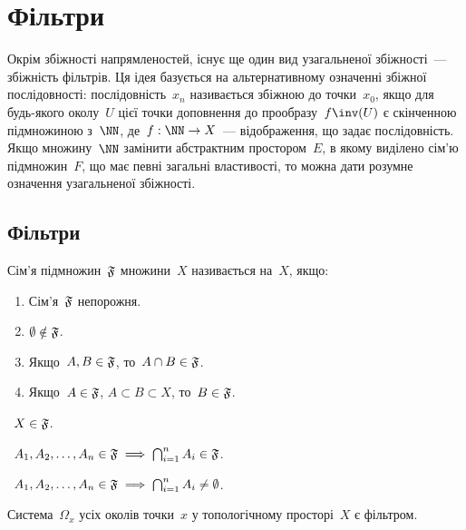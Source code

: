 \chapter{Фільтри}

Окрім збіжності напрямленостей, існує ще один вид узагальненої збіжності~--- збіжність фільтрів. Ця ідея базується на альтернативному означенні збіжної послідовності: послідовність~$x_n$ називається збіжною до точки~$x_0$, якщо для будь-якого околу~$U$ цієї точки доповнення до прообразу~$f\inv (U)$ є скінченною підмножиною з~$\NN$, де~$f: \NN \to X$~--- відображення, що задає послідовність. Якщо множину~$\NN$ замінити абстрактним простором~$E$, в якому виділено сім'ю підмножин~$F$, що має певні загальні властивості, то можна дати розумне означення узагальненої збіжності.

\section{Фільтри}

\begin{definition}
    Сім'я підмножин~$\frak F$ множини~$X$ називається  на~$X$, якщо:
    \begin{enumerate}
        \item Сім'я~$\frak F$ непорожня.
        \item $\emptyset \notin \frak F$.
        \item Якщо~$A, B \in \frak F$, то~$A \cap B \in \frak F$.
        \item Якщо~$A \in \frak F$, $A \subset B \subset X$, то~$B \in \frak F$.
    \end{enumerate}
\end{definition}

\begin{corollary}
   ~$X \in \frak F$.
\end{corollary}

\begin{corollary}
   ~$A_1, A_2, \dots, A_n \in \frak F \implies \bigcap_{i = 1}^n A_i \in \frak F$.
\end{corollary}

\begin{corollary}
   ~$A_1, A_2, \dots, A_n \in \frak F \implies \bigcap_{i = 1}^n A_i \ne \emptyset$.
\end{corollary}

\begin{example}
    Система~$\Omega_x$ усіх околів точки~$x$ у топологічному просторі~$X$ є фільтром.
\end{example}

